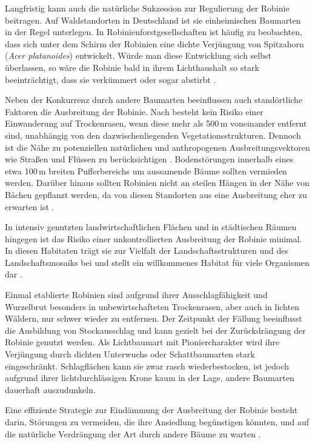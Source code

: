 \documentclass[twocolumn]{scrartcl}
\begin{document}
Langfristig kann auch die natürliche Sukzession zur Regulierung der
Robinie beitragen. Auf Waldstandorten in Deutschland ist sie
einheimischen Baumarten in der Regel unterlegen. In
Robinienforstgesellschaften ist häufig zu beobachten, dass sich unter
dem Schirm der Robinien eine dichte Verjüngung von Spitzahorn
(\emph{Acer platanoides}) entwickelt. Würde man diese Entwicklung sich
selbst überlassen, so wäre die Robinie bald in ihrem Lichthaushalt so
stark beeinträchtigt, dass sie verkümmert oder sogar abstirbt
\citep{kohler1963robinie}.

Neben der Konkurrenz durch andere Baumarten beeinflussen auch
standörtliche Faktoren die Ausbreitung der Robinie. Nach
\citet[S.~134]{landeck2022robinie} besteht kein Risiko einer
Einwanderung auf Trockenrasen, wenn diese mehr als 500\,m voneinander
entfernt sind, unabhängig von den dazwischenliegenden
Vegetationsstrukturen. Dennoch ist die Nähe zu potenziellen
natürlichen und anthropogenen Ausbreitungsvektoren wie Straßen und
Flüssen zu berücksichtigen
\citep{skowronek2020robinieNaturschutz}. Bodenstörungen innerhalb
eines etwa 100\,m breiten Pufferbereichs um aussamende Bäume sollten
vermieden werden. Darüber hinaus sollten Robinien nicht an steilen
Hängen in der Nähe von Bächen gepflanzt werden, da von diesen
Standorten aus eine Ausbreitung eher zu erwarten ist
\citep{morimoto2009robinie}.

In intensiv genutzten landwirtschaftlichen Flächen und in städtischen
Räumen hingegen ist das Risiko einer unkontrollierten Ausbreitung der
Robinie minimal. In diesen Habitaten trägt sie zur Vielfalt der
Landschaftsstrukturen und des Landschaftsmosaiks bei und stellt ein
willkommenes Habitat für viele Organismen dar
\citep{vitkova2018robinie}.

Einmal etablierte Robinien sind aufgrund ihrer Ausschlagfähigkeit und
Wurzelbrut besonders in unbewirtschafteten Trockenrasen, aber auch in
lichten Wäldern, nur schwer wieder zu entfernen. Der Zeitpunkt der
Fällung beeinflusst die Ausbildung von Stockausschlag und kann gezielt
bei der Zurückdrängung der Robinie genutzt werden. Als Lichtbaumart
mit Pioniercharakter wird ihre Verjüngung durch dichten Unterwuchs
oder Schattbaumarten stark eingeschränkt. Schlagflächen kann sie zwar
rasch wiederbestocken, ist jedoch aufgrund ihrer lichtdurchlässigen
Krone kaum in der Lage, andere Baumarten dauerhaft auszudunkeln.

Eine effiziente Strategie zur Eindämmung der Ausbreitung der Robinie
besteht darin, Störungen zu vermeiden, die ihre Ansiedlung begünstigen
könnten, und auf die natürliche Verdrängung der Art durch andere Bäume
zu warten \citep{motta2009robinieBekaempfung}.
\end{document}
